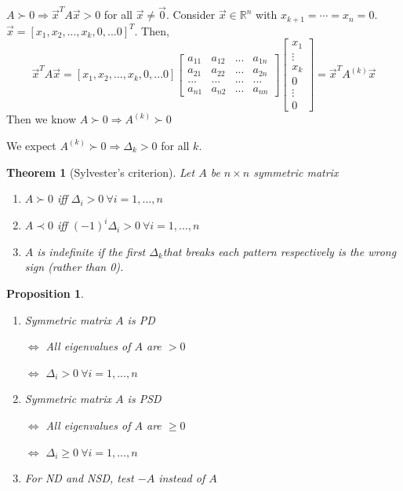 \documentclass[11pt,a4paper]{article}
\newtheorem{theorem}{Theorem}
\newtheorem{proposition}{Proposition}
\begin{document}
$A\succ 0\Rightarrow \vec{x}^TA\vec{x}>0$ for all $\vec{x}\neq \vec{0}$. Consider $\vec{x}\in \mathbb{R}^n$ with $x_{k+1}=\cdots=x_n=0$. $\vec{x}=[x_1,x_2,...,x_k,0,...0]^T$. Then,
$$\vec{x}^TA\vec{x}=[x_1,x_2,...,x_k,0,...0]\begin{bmatrix}
    a_{11}&a_{12}&... &a_{1n}\\a_{21}&a_{22}&...&a_{2n}\\...&...&...&...\\a_{n1}&a_{n2}&...&a_{nn}
\end{bmatrix}\begin{bmatrix}
    x_1\\
    \vdots\\
    x_k\\
    0\\
    \vdots\\
    0
\end{bmatrix}=\vec{x}^TA^{(k)}\vec{x}$$
Then we know $A\succ 0 \Rightarrow A^{(k)}\succ 0$

We expect $A^{(k)}\succ 0\Rightarrow \Delta_k>0$ for all $k$.

\begin{theorem}[Sylvester’s criterion]Let $A$ be $n\times n$ symmetric matrix
    \begin{enumerate}
        \item $A\succ 0$ iff $\Delta_i>0\ \forall i=1,...,n$
        \item $A\prec 0$ iff $(-1)^i\Delta_i>0\ \forall i=1,...,n$
        \item $A$ is indefinite if the first $\Delta_k$that breaks each pattern respectively is the wrong sign (rather than 0).
    \end{enumerate}
\end{theorem}
\begin{proposition}
    \quad

\begin{enumerate}
    \item Symmetric matrix $A$ is PD

    $\Leftrightarrow$ All eigenvalues of $A$ are $>0$
    
    $\Leftrightarrow$ $\Delta_i>0\ \forall i=1,...,n$
    \item Symmetric matrix $A$ is PSD

    $\Leftrightarrow$ All eigenvalues of $A$ are $\geq 0$
    
    $\Leftrightarrow$ $\Delta_i\geq 0\ \forall i=1,...,n$
    \item For ND and NSD, test $-A$ instead of $A$
\end{enumerate}
\end{proposition}
\end{document}
